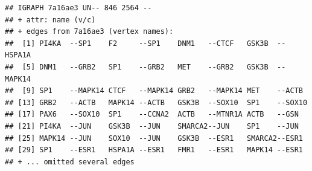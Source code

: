 \documentclass[
]{book}
\newenvironment{Shaded}{\begin{snugshade}}{\end{snugshade}}
\newcommand{\AttributeTok}[1]{\textcolor[rgb]{0.77,0.63,0.00}{#1}}
\newcommand{\ConstantTok}[1]{\textcolor[rgb]{0.00,0.00,0.00}{#1}}
\newcommand{\DecValTok}[1]{\textcolor[rgb]{0.00,0.00,0.81}{#1}}
\newcommand{\FloatTok}[1]{\textcolor[rgb]{0.00,0.00,0.81}{#1}}
\newcommand{\FunctionTok}[1]{\textcolor[rgb]{0.00,0.00,0.00}{#1}}
\newcommand{\NormalTok}[1]{#1}
\newcommand{\OtherTok}[1]{\textcolor[rgb]{0.56,0.35,0.01}{#1}}
\newcommand{\SpecialCharTok}[1]{\textcolor[rgb]{0.00,0.00,0.00}{#1}}
\newcommand{\StringTok}[1]{\textcolor[rgb]{0.31,0.60,0.02}{#1}}
\begin{document}
\begin{verbatim}
## IGRAPH 7a16ae3 UN-- 846 2564 -- 
## + attr: name (v/c)
## + edges from 7a16ae3 (vertex names):
##  [1] PI4KA  --SP1    F2     --SP1    DNM1   --CTCF   GSK3B  --HSPA1A
##  [5] DNM1   --GRB2   SP1    --GRB2   MET    --GRB2   GSK3B  --MAPK14
##  [9] SP1    --MAPK14 CTCF   --MAPK14 GRB2   --MAPK14 MET    --ACTB  
## [13] GRB2   --ACTB   MAPK14 --ACTB   GSK3B  --SOX10  SP1    --SOX10 
## [17] PAX6   --SOX10  SP1    --CCNA2  ACTB   --MTNR1A ACTB   --GSN   
## [21] PI4KA  --JUN    GSK3B  --JUN    SMARCA2--JUN    SP1    --JUN   
## [25] MAPK14 --JUN    SOX10  --JUN    GSK3B  --ESR1   SMARCA2--ESR1  
## [29] SP1    --ESR1   HSPA1A --ESR1   FMR1   --ESR1   MAPK14 --ESR1  
## + ... omitted several edges
\end{verbatim}

\begin{Shaded}
\end{Shaded}
\end{document}
